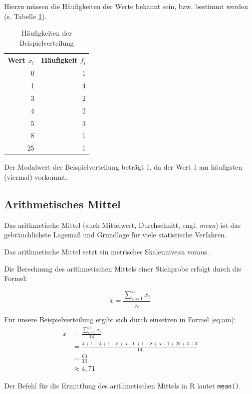 \documentclass[
  11pt,
  ngerman,
  a4paper,
]{report}
\newenvironment{rtip}{
  \medskip
  \begin{tcolorbox}[colframe=purple,colback=light_gray,title=Softwarehinweis]
}{
  \end{tcolorbox}
  \medskip
}
\begin{document}
Hierzu müssen die Häufigkeiten der Werte bekannt sein, bzw. bestimmt werden (s. Tabelle \ref{tab:mod}).

\begin{table}

\caption{\label{tab:mod}Häufigkeiten der Beispielverteilung}
\centering
\begin{tabular}[t]{rr}
\toprule
Wert $x_i$ & Häufigkeit $f_i$\\
\midrule
0 & 1\\
1 & 4\\
3 & 2\\
4 & 2\\
5 & 3\\
8 & 1\\
25 & 1\\
\bottomrule
\end{tabular}
\end{table}

Der Modalwert der Beispielverteilung beträgt 1, da der Wert 1 am häufigsten (viermal) vorkommt.

\hypertarget{arithmetisches-mittel}{%
\subsection{Arithmetisches Mittel}\label{arithmetisches-mittel}}

Das arithmetische Mittel (auch Mittelwert, Durchschnitt, engl. \emph{mean}) ist das gebräuchlichste Lagemaß und Grundlage für viele statistische Verfahren.

Das arithmetische Mittel setzt ein metrisches Skalenniveau voraus.

Die Berechnung des arithmetischen Mittels einer Stichprobe erfolgt durch die Formel:

\[
 \bar{x}=\frac{\sum\limits _{i=1}^{n}x_{i}}{n}
 \label{eq:am}
\]

Für unsere Beispielverteilung ergibt sich durch einsetzen in Formel \eqref{eq:am}:
\[
  \begin{aligned}
     \bar{x}&=\frac{\sum\limits _{i=1}^{14}x_{i}}{14} \\[4pt]
            &=\frac{4+1+4+1+5+5+0+1+8+5+1+25+3+3}{14} \\[4pt]
            &=\frac{63}{14}\\[4pt]
            &\approx 4{,}71
  \end{aligned}
\]

\begin{rtip}
Der Befehl für die Ermittlung des arithmetischen Mittels in R lautet \verb|mean()|.
\end{rtip}
\end{document}
